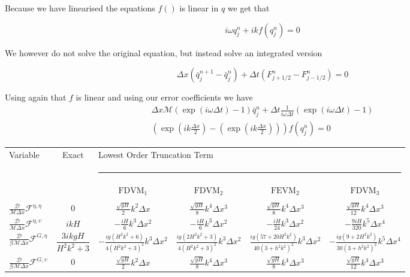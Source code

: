 \documentclass[12pt]{article}
\begin{document}
Because we have linearised the equations $f()$ is linear in $q$ we get that

\[i\omega q^n_j + ik f(q^n_j) = 0\]

We however do not solve the original equation, but instead solve an integrated version

\[\Delta x\left(\bar{q}^{n+1}_j - \bar{q}^{n}_j \right) + \Delta t \left(F^n_{j+1/2} - F^n_{j-1/2}\right) = 0\]

Using again that $f$ is linear and using our error coefficients we have
\begin{multline}
\Delta x \mathcal{M}\left(\exp\left(i \omega \Delta t\right) - 1 \right)\bar{q}^{n}_j  + \Delta t \frac{1}{i \omega \Delta t}\left(\exp\left(i \omega \Delta t\right) - 1\right) \\\left(\exp\left(i k \frac{\Delta x}{2}\right) - \left(\exp\left(i k \frac{\Delta x}{2}\right)\right) \right)f(q^n_j) = 0
\end{multline}
\fi


\begin{adjustbox}{angle=90}
  \begin{tabular}{l c c c c c}
     	Variable& Exact &\multicolumn{4}{l}{Lowest Order Truncation Term}\\
     	 & &  \multicolumn{4}{l}{\rule{1\textwidth}{0.4pt}} \\
     	 & & $\text{FDVM}_1$& $\text{FDVM}_2$& $\text{FEVM}_2$ & $\text{FDVM}_3$ \\
     	 \hline \\
     	$ \frac{\mathcal{D}}{\mathcal{M}\Delta x}\mathcal{F}^{\eta,\eta}$& $0$ & $\frac{\sqrt{gH}}{2}k^2 \Delta x$&$\frac{\sqrt{gH}}{8}k^4 \Delta x^3$& $\frac{\sqrt{gH}}{8}k^4 \Delta x^3$ & $\frac{\sqrt{gH}}{12}k^4 \Delta x^3$ \\ [5mm]
     	$\frac{\mathcal{D}}{\mathcal{M}\Delta x} \mathcal{F}^{\eta,\upsilon}$& $ikH$  &$ -\frac{iH}{6} k^3 \Delta x^2$&$ -\frac{iH}{6} k^3 \Delta x^2$& $ -\frac{iH}{24} k^3 \Delta x^2$ & $ -\frac{9iH}{320} k^5 \Delta x^4$ \\ [5mm]
  	    $ \frac{\mathcal{D}}{\mathcal{G}\mathcal{M}\Delta x} \mathcal{F}^{G,\eta}$& $\dfrac{3ikgH}{H^2k^2 +3}$ & $-\frac{ig\left(H^2k^2 + 6\right)}{4\left(H^2k^2 +3\right)^2} k^3 \Delta x^2$ & $\frac{ig\left(2H^2k^2 + 3\right)}{4\left(H^2k^2 +3\right)^2} k^3 \Delta x^2$& $\frac{ig\left(57 + 20H^2k^2\right)}{40\left(3 + h^2k^2\right)^2} k^3 \Delta x^2$ & $-\frac{ig\left(9 + 2H^2k^2\right)}{30\left(3 + h^2 k^2\right)^2}k^5 \Delta x^4$ \\  [5mm]
  	    $\frac{\mathcal{D}}{\mathcal{G}\mathcal{M}\Delta x} \mathcal{F}^{G,\upsilon}$& $0$ & $\frac{\sqrt{gH}}{2}k^2 \Delta x$&$\frac{\sqrt{gH}}{8}k^4 \Delta x^3$& $\frac{\sqrt{gH}}{8}k^4 \Delta x^3$ & $\frac{\sqrt{gH}}{12}k^4 \Delta x^3$ \\ 
  \end{tabular}
\end{adjustbox}
\end{document}
